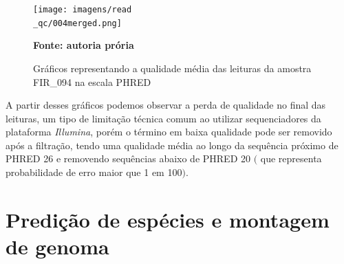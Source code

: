 \begin{figure}[H]
	\caption{Gráficos representando a qualidade média das leituras da amostra FIR\_094 na escala PHRED}
	\centering
	\texttt{[image: imagens/read\\\_qc/004merged.png]} \\
	\centering
    \begin{small}\textbf{Fonte: autoria prória}\end{small}
\end{figure}
\vspace{\floatsep}

A partir desses gráficos podemos observar a perda de qualidade no final das leituras, um tipo de limitação
técnica comum ao utilizar sequenciadores da plataforma \textit{Illumina}, porém o término em baixa qualidade
pode ser removido após a filtração, tendo uma qualidade média ao longo da sequência próximo de PHRED 26 e
removendo sequências abaixo de PHRED 20 $($ que representa probabilidade de erro maior que 1 em 100$)$.


\section{Predição de espécies e montagem de genoma}

